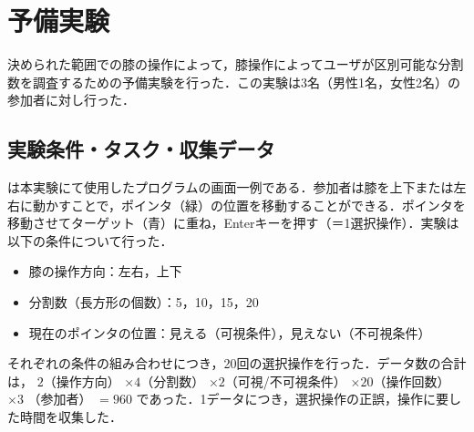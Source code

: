 \documentclass[submit, techrep]{ipsj}
\begin{document}
\section{予備実験}
決められた範囲での膝の操作によって，膝操作によってユーザが区別可能な分割数を調査するための予備実験を行った．この実験は3名（男性1名，女性2名）の参加者に対し行った．

\subsection{実験条件・タスク・収集データ}
は本実験にて使用したプログラムの画面一例である．参加者は膝を上下または左右に動かすことで，ポインタ（緑）の位置を移動することができる．ポインタを移動させてターゲット（青）に重ね，Enterキーを押す（＝1選択操作）．実験は以下の条件について行った．
\begin{itemize}
	\item{膝の操作方向：}左右，上下
	\item{分割数（長方形の個数）：}5，10，15，20
	\item{現在のポインタの位置：}見える（可視条件），見えない（不可視条件）
\end{itemize}
それぞれの条件の組み合わせにつき，20回の選択操作を行った．データ数の合計は，
$2$（操作方向） $\times 4$（分割数） $\times 2$（可視/不可視条件） $\times 20$（操作回数） $\times 3$ （参加者） $= 960$
であった．1データにつき，選択操作の正誤，操作に要した時間を収集した．

\end{document}
